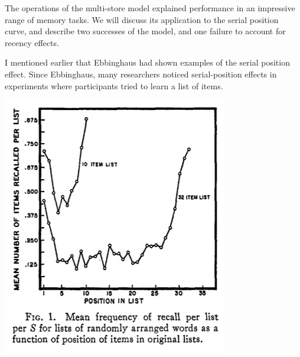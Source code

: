 \documentclass[
  oneside,
  12pt]{crumpbook}
\newenvironment{floatright50}{%
  \wrapfigure{R}{.5\textwidth}%
  }{%
  \endwrapfigure}
\begin{document}
The operations of the multi-store model explained performance in an impressive range of memory tasks. We will discuss its application to the serial position curve, and describe two successes of the model, and one failure to account for recency effects.

I mentioned earlier that Ebbinghaus had shown examples of the serial position effect. Since Ebbinghaus, many researchers noticed serial-position effects in experiments where participants tried to learn a list of items.

\begin{floatright50}
\includegraphics[width=1\linewidth]{imgs/Serial_position_1}

\end{floatright50}
\end{document}
